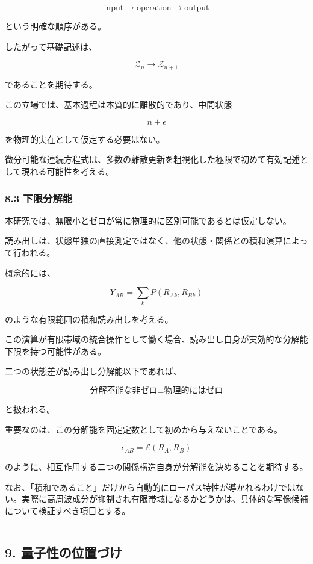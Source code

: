 \documentclass[
  a4paper,
]{ltjsarticle}
\begin{document}
\[
\text{input}
\rightarrow
\text{operation}
\rightarrow
\text{output}
\]

という明確な順序がある。

したがって基礎記述は、

\[
\boxed{
\mathcal Z_n\rightarrow\mathcal Z_{n+1}
}
\]

であることを期待する。

この立場では、基本過程は本質的に離散的であり、中間状態

\[
n+\epsilon
\]

を物理的実在として仮定する必要はない。

微分可能な連続方程式は、多数の離散更新を粗視化した極限で初めて有効記述として現れる可能性を考える。

\subsubsection{8.3 下限分解能}\label{ux4e0bux9650ux5206ux89e3ux80fd}

本研究では、無限小とゼロが常に物理的に区別可能であるとは仮定しない。

読み出しは、状態単独の直接測定ではなく、他の状態・関係との積和演算によって行われる。

概念的には、

\[
Y_{AB}
=
\sum_k P(R_{Ak},R_{Bk})
\]

のような有限範囲の積和読み出しを考える。

この演算が有限帯域の統合操作として働く場合、読み出し自身が実効的な分解能下限を持つ可能性がある。

二つの状態差が読み出し分解能以下であれば、

\[
\boxed{
\text{分解不能な非ゼロ}\equiv\text{物理的にはゼロ}
}
\]

と扱われる。

重要なのは、この分解能を固定定数として初めから与えないことである。

\[
\boxed{
\epsilon_{AB}=\mathcal E(R_A,R_B)
}
\]

のように、相互作用する二つの関係構造自身が分解能を決めることを期待する。

なお、「積和であること」だけから自動的にローパス特性が導かれるわけではない。実際に高周波成分が抑制され有限帯域になるかどうかは、具体的な写像候補について検証すべき項目とする。

\begin{center}\rule{0.5\linewidth}{0.5pt}\end{center}

\subsection{9.
量子性の位置づけ}\label{ux91cfux5b50ux6027ux306eux4f4dux7f6eux3065ux3051}
\end{document}
